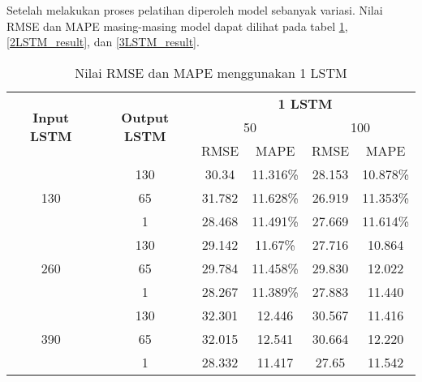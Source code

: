 \documentclass[../thesis.tex]{subfiles}
\begin{document}
Setelah melakukan proses pelatihan diperoleh model sebanyak variasi. Nilai RMSE dan MAPE masing-masing model dapat dilihat pada tabel \ref{1LSTM_result}, \ref{2LSTM_result}, dan \ref{3LSTM_result}.
\begin{table}[htp]
\centering
\begin{tabular}{|c|c|c|c|c|c|}
	\hline 
	\multirow{3}{*}{\textbf{Input LSTM}} & \multirow{3}{*}{\textbf{Output LSTM}} & \multicolumn{4}{c|}{\textbf{1 LSTM}} \\ \cline{3-6}
	&  & \multicolumn{2}{c|}{50}& \multicolumn{2}{c|}{100} \\ \cline{3-6}
	& & RMSE & MAPE& RMSE & MAPE\\
	\hline
	\multirow{3}{*}{130} & 130 & 30.34& 11.316\%& 28.153 & 10.878\%\\
	& 65 & 31.782 & 11.628\% & 26.919 & 11.353\% \\
	& 1 & 28.468 & 11.491\% & 27.669 & 11.614\% \\
	\hline
	\multirow{3}{*}{260} & 130 & 29.142 & 11.67\%  & 27.716 & 10.864\\
	& 65 & 29.784 & 11.458\% & 29.830 & 12.022\\
	& 1 & 28.267 & 11.389\% & 27.883 & 11.440 \\
	\hline
	\multirow{3}{*}{390} & 130 & 32.301 & 12.446 & 30.567 & 11.416 \\
	& 65 & 32.015 & 12.541 & 30.664 & 12.220 \\
	& 1 & 28.332 & 11.417 & 27.65 & 11.542 \\
	\hline
\end{tabular}
\caption{Nilai RMSE dan MAPE menggunakan 1 LSTM}
\label{1LSTM_result}
\end{table} 
\end{document}
